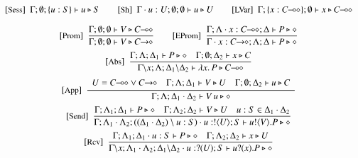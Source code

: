 

\begin{figure}[t]
\[
	\begin{array}{c}
		\trule{Sess}~~\Gamma; \emptyset; \set{u:S} \proves u \hastype S 
		\qquad
		\trule{Sh}~~\Gamma \cat u : U; \emptyset; \emptyset \proves u \hastype U
		\qquad
		\trule{LVar}~~\Gamma; \set{x: \lhot{C}}; \emptyset \proves x \hastype \lhot{C}
		\\[4mm]

		\trule{Prom}~~\tree{
			\Gamma; \emptyset; \emptyset \proves V \hastype 
                         \lhot{C}
		}{
			\Gamma; \emptyset; \emptyset \proves V \hastype 
                         \shot{C}
		} 
		\qquad
		\trule{EProm}~~\tree{
		\Gamma; \Lambda \cat x : \lhot{C}; \Delta \proves P \hastype \Proc
		}{
			\Gamma \cat x:\shot{C}; \Lambda; \Delta \proves P \hastype \Proc
		}
		\\[4mm]

		\trule{Abs}~~\tree{
			\Gamma; \Lambda; \Delta_1 \proves P \hastype \Proc
			\quad
			\Gamma; \es; \Delta_2 \proves x \hastype C
		}{
			\Gamma\backslash x; \Lambda; \Delta_1 \backslash \Delta_2 \proves \abs{{x}}{P} \hastype \lhot{{C}}
		}
		\\[4mm]

		\trule{App}~~\tree{
			\begin{array}{c}
				U = \lhot{C} \lor \shot{C}
				\quad
				\Gamma; \Lambda; \Delta_1 \proves V \hastype U
				\quad
				\Gamma; \es; \Delta_2 \proves u \hastype C
			\end{array}
		}{
			\Gamma; \Lambda; \Delta_1 \cat \Delta_2 \proves \appl{V}{u} \hastype \Proc
		} 
		\\[4mm]

		\trule{Send}~~\tree{
			\Gamma; \Lambda_1; \Delta_1 \proves P \hastype \Proc
			\quad
			\Gamma; \Lambda_2; \Delta_2 \proves V \hastype U
			\quad
			u:S \in \Delta_1 \cat \Delta_2
		}{
			\Gamma; \Lambda_1 \cat \Lambda_2; ((\Delta_1 \cat \Delta_2) \setminus u:S) \cat u:\btout{U} S \proves \bout{u}{V} P \hastype \Proc
		}
		\\[4mm]

		\trule{Rcv}~~\tree{
			\Gamma; \Lambda_1; \Delta_1 \cat u: S \proves P \hastype \Proc
			\quad
			\Gamma; \Lambda_2; \Delta_2 \proves {x} \hastype {U}
		}{
			\Gamma \backslash x; \Lambda_1\cat \Lambda_2; \Delta_1\backslash \Delta_2 \cat u: \btinp{U} S \vdash \binp{u}{{x}} P \hastype \Proc
		}
		\\[4mm]


\end{array}\]
\end{figure}
